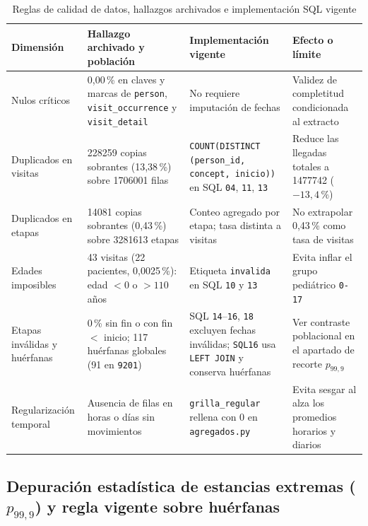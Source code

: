 \begin{table}[htbp]
\caption{Reglas de calidad de datos, hallazgos archivados e implementación SQL vigente}
\label{tab:reglas_calidad}
{\singlespacing\small
\begin{tabularx}{\textwidth}{@{}L{0.18\textwidth} L{0.30\textwidth} L{0.24\textwidth} Y@{}}
\toprule
Dimensión & Hallazgo archivado y población & Implementación vigente & Efecto o límite \\
\midrule
Nulos críticos & 0,00\,\% en claves y marcas de \texttt{person}, \texttt{visit\_occurrence} y \texttt{visit\_detail} & No requiere imputación de fechas & Validez de completitud condicionada al extracto \\
Duplicados en visitas & \num{228259} copias sobrantes (13,38\,\%) sobre \num{1706001} filas & \texttt{COUNT(DISTINCT (person\_id, concept, inicio))} en SQL \texttt{04}, \texttt{11}, \texttt{13} & Reduce las llegadas totales a \num{1477742} ($-13{,}4\,\%$) \\
Duplicados en etapas & \num{14081} copias sobrantes (0,43\,\%) sobre \num{3281613} etapas & Conteo agregado por etapa; tasa distinta a visitas & No extrapolar 0,43\,\% como tasa de visitas \\
Edades imposibles & 43 visitas (22 pacientes, 0,0025\,\%): edad $<0$ o $>110$ años & Etiqueta \texttt{invalida} en SQL \texttt{10} y \texttt{13} & Evita inflar el grupo pediátrico \texttt{0-17} \\
Etapas inválidas y huérfanas & 0\,\% sin fin o con fin $<$ inicio; 117 huérfanas globales (91 en \texttt{9201}) & SQL \texttt{14}--\texttt{16}, \texttt{18} excluyen fechas inválidas; \texttt{SQL16} usa \texttt{LEFT JOIN} y conserva huérfanas & Ver contraste poblacional en el apartado de recorte $p_{99{,}9}$ \\
Regularización temporal & Ausencia de filas en horas o días sin movimientos & \texttt{grilla\_regular} rellena con 0 en \texttt{agregados.py} & Evita sesgar al alza los promedios horarios y diarios \\
\bottomrule
\end{tabularx}}
\end{table}

\subsection{Depuración estadística de estancias extremas (\texorpdfstring{$p_{99{,}9}$}{p99.9}) y regla vigente sobre huérfanas}

